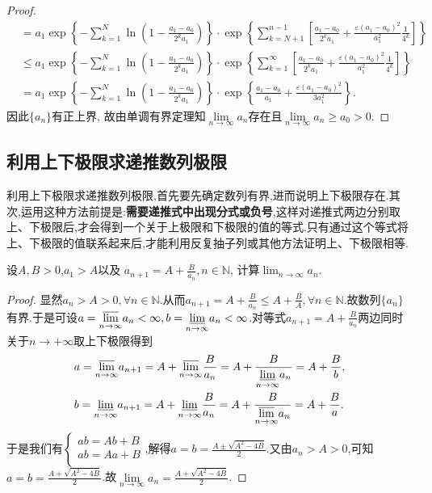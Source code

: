 \documentclass[../../main.tex]{subfiles}%
\begin{document}
\begin{proof}
\begin{align*}
&= a_1\exp\left\{ -\sum\limits_{k=1}^N \ln\left( 1-\frac{a_1-a_0}{2^k a_1} \right) \right\} \cdot \exp\left\{ \sum\limits_{k=N+1}^{n-1} \left[ \frac{a_1-a_0}{2^k a_1}+\frac{\varepsilon \left( a_1-a_0 \right)^2}{a_1^2}\frac{1}{4^k} \right] \right\} \\
&\leqslant a_1\exp\left\{ -\sum\limits_{k=1}^N \ln\left( 1-\frac{a_1-a_0}{2^k a_1} \right) \right\} \cdot \exp\left\{ \sum\limits_{k=1}^{\infty} \left[ \frac{a_1-a_0}{2^k a_1}+\frac{\varepsilon \left( a_1-a_0 \right)^2}{a_1^2}\frac{1}{4^k} \right] \right\} \\
&= a_1\exp\left\{ -\sum\limits_{k=1}^N \ln\left( 1-\frac{a_1-a_0}{2^k a_1} \right) \right\} \cdot \exp\left\{ \frac{a_1-a_0}{a_1}+\frac{\varepsilon \left( a_1-a_0 \right)^2}{3a_1^2} \right\}.
\end{align*}
因此$\{a_n\}$有正上界, 故由单调有界定理知$\lim\limits_{n\rightarrow \infty}a_n$存在且$\lim\limits_{n\rightarrow \infty}a_n\geqslant a_0>0$.
\end{proof}



\subsection{利用上下极限求递推数列极限}

利用上下极限求递推数列极限,首先要先确定数列有界,进而说明上下极限存在.其次,运用这种方法前提是:\textbf{需要递推式中出现分式或负号},这样对递推式两边分别取上、下极限后,才会得到一个关于上极限和下极限的值的等式.只有通过这个等式将上、下极限的值联系起来后,才能利用反复抽子列或其他方法证明上、下极限相等.

\begin{example}
设\(A,B > 0\),\(a_1 > A\)以及
\(a_{n + 1} = A + \frac{B}{a_n}, n \in \mathbb{N}\),
计算\(\lim_{n \to \infty} a_n\).
\end{example}
\begin{proof}
显然$a_n>A>0,\forall n\in\mathbb{N}$.从而$a_{n+1}=A+\frac{B}{a_n}\leqslant  A+\frac{B}{A},\forall n\in\mathbb{N}$.故数列$\{a_n\}$有界.于是可设$a=\underset{n\rightarrow \infty}{{\varlimsup }}a_n<\infty,b=\underset{n\rightarrow \infty}{{\varliminf }}a_n<\infty$.对等式$a_{n + 1} = A + \frac{B}{a_n}$两边同时关于$n\to+\infty$取上下极限得到
\begin{align*}
&a=\underset{n\rightarrow \infty}{{\varlimsup }}a_{n+1}=A+\underset{n\rightarrow \infty}{{\varlimsup }}\frac{B}{a_n}=A+\frac{B}{\underset{n\rightarrow \infty}{{\varliminf }}a_n}=A+\frac{B}{b},
\\
&b=\underset{n\rightarrow \infty}{{\varliminf }}a_{n+1}=A+\underset{n\rightarrow \infty}{{\varliminf }}\frac{B}{a_n}=A+\frac{B}{\underset{n\rightarrow \infty}{{\varlimsup }}a_n}=A+\frac{B}{a}.
\end{align*}
于是我们有$\begin{cases}
ab=Ab+B\\
ab=Aa+B\\
\end{cases}$,解得$a=b=\frac{A\pm\sqrt{A^2-4B}}{2}$.又由$a_n>A>0$,可知$a=b=\frac{A+\sqrt{A^2-4B}}{2}$.故$\underset{n\rightarrow \infty}{\lim}a_n=\frac{A+\sqrt{A^2-4B}}{2}$.
\end{proof}
\end{document}
